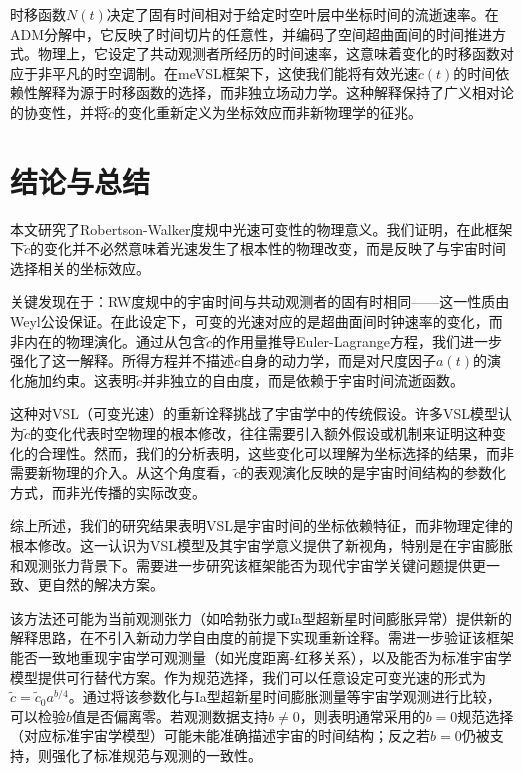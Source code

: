 \documentclass[jkps,preprint,fleqn]{revtex4}
\newcommand{\tc}{\tilde{c}}
\begin{document}
时移函数$N(t)$决定了固有时间相对于给定时空叶层中坐标时间的流逝速率。在ADM分解中，它反映了时间切片的任意性，并编码了空间超曲面间的时间推进方式。物理上，它设定了共动观测者所经历的时间速率，这意味着变化的时移函数对应于非平凡的时空调制。在meVSL框架下，这使我们能将有效光速$\tc(t)$的时间依赖性解释为源于时移函数的选择，而非独立场动力学。这种解释保持了广义相对论的协变性，并将$\tc$的变化重新定义为坐标效应而非新物理学的征兆。
\section{结论与总结}\label{sec:Conc}
本文研究了Robertson-Walker度规中光速可变性的物理意义。我们证明，在此框架下$\tc$的变化并不必然意味着光速发生了根本性的物理改变，而是反映了与宇宙时间选择相关的坐标效应。

关键发现在于：RW度规中的宇宙时间与共动观测者的固有时相同——这一性质由Weyl公设保证。在此设定下，可变的光速对应的是超曲面间时钟速率的变化，而非内在的物理演化。通过从包含$\tc$的作用量推导Euler-Lagrange方程，我们进一步强化了这一解释。所得方程并不描述$c$自身的动力学，而是对尺度因子$a(t)$的演化施加约束。这表明$\tc$并非独立的自由度，而是依赖于宇宙时间流逝函数。

这种对VSL（可变光速）的重新诠释挑战了宇宙学中的传统假设。许多VSL模型认为$\tc$的变化代表时空物理的根本修改，往往需要引入额外假设或机制来证明这种变化的合理性。然而，我们的分析表明，这些变化可以理解为坐标选择的结果，而非需要新物理的介入。从这个角度看，$\tc$的表观演化反映的是宇宙时间结构的参数化方式，而非光传播的实际改变。

综上所述，我们的研究结果表明VSL是宇宙时间的坐标依赖特征，而非物理定律的根本修改。这一认识为VSL模型及其宇宙学意义提供了新视角，特别是在宇宙膨胀和观测张力背景下。需要进一步研究该框架能否为现代宇宙学关键问题提供更一致、更自然的解决方案。

该方法还可能为当前观测张力（如哈勃张力或Ia型超新星时间膨胀异常）提供新的解释思路，在不引入新动力学自由度的前提下实现重新诠释。需进一步验证该框架能否一致地重现宇宙学可观测量（如光度距离-红移关系），以及能否为标准宇宙学模型提供可行替代方案。作为规范选择，我们可以任意设定可变光速的形式为$\tc = \tc_0 a^{b/4}$。通过将该参数化与Ia型超新星时间膨胀测量等宇宙学观测进行比较，可以检验$b$值是否偏离零。若观测数据支持$b \neq 0$，则表明通常采用的$b=0$规范选择（对应标准宇宙学模型）可能未能准确描述宇宙的时间结构；反之若$b=0$仍被支持，则强化了标准规范与观测的一致性。
\end{document}
